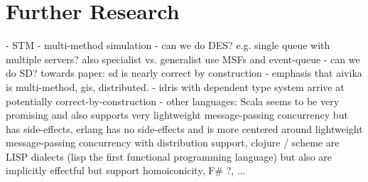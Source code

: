 \section{Further Research}
- STM
- multi-method simulation
	- can we do DES? e.g. single queue with multiple servers? also specialist vs. generalist use MSFs and event-queue
	- can we do SD? towards paper: sd is nearly correct by construction
	- emphasis that aivika is multi-method, gis, distributed. 
- idris with dependent type system arrive at potentially correct-by-construction
- other languages: Scala seems to be very promising and also supports very lightweight message-passing concurrency but has side-effects, erlang has no side-effects and is more centered around lightweight message-passing concurrency with distribution support, clojure / scheme are LISP dialects (lisp the first functional programming language) but also are implicitly effectful but support homoiconicity, F\# ?, ... 